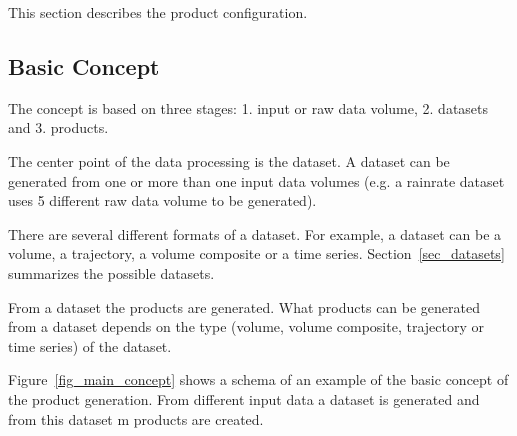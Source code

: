 \documentclass[a4paper,11pt,pdftex,twoside]{scrartcl}
\begin{document}
{{{This section describes the product configuration.

\subsection{Basic Concept}

The concept is based on three stages: 1. input or raw data volume, 2. datasets
and 3. products.

The center point of the data processing is the dataset. A dataset can be
generated from one or more than one input data volumes (e.g. a rainrate dataset
uses 5 different raw data volume to be generated).

There are several different formats of a dataset. For example, a dataset can be a
volume, a trajectory, a volume composite or a time series.
Section~\ref{sec_datasets} summarizes the possible datasets.

From a dataset the products are generated. What products can be generated from
a dataset depends on the type (volume, volume composite, trajectory or
time series) of the dataset.

Figure~\ref{fig_main_concept} shows a schema of an example of the basic concept
of the product generation. From different input data a dataset
is generated and from this dataset m products are created.

}}}
\end{document}
